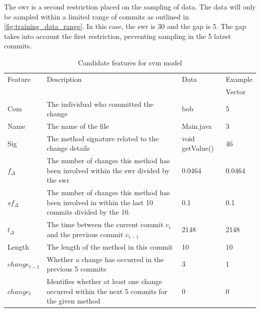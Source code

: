 The \gls{swr} is a second restriction placed on the sampling of data. The data will only be sampled within a limited range of commits as outlined in \autoref{fig:training_data_range}. In this case, the \gls{swr} is 30 and the gap is 5. The gap takes into account the first restriction, preventing sampling in the 5 latest commits.


\begin{table}
\begin{center}
    \begin{tabularx}{\linewidth}{|l|X|l|l|}
        \hline
        Feature & Description & Data & Example \\
         & & & Vector \\
        \hline
        Com & The individual who committed the change & bob & 5 \\ \hline
        Name & The name of the file & Main.java & 3 \\ \hline
        Sig & The method signature related to the change details & void getValue() & 46\\ \hline
        
        $f_{\Delta}$ & The number of changes this method has been involved within the \gls{swr} divided by the \gls{swr} & 0.0464 & 0.0464 \\ \hline
        $sf_{\Delta}$ & The number of changes this method has been involved in within the last 10 commits divided by the 10. & 0.1 & 0.1 \\ \hline
        $t_\Delta$ & The time between the current commit $c_i$ and the previous commit $c_{i-1}$ & 2148 & 2148 \\ \hline

        Length & The length of the method in this commit & 10 & 10 \\ \hline
        $change_{t-1}$ & Whether a change has occurred in the previous 5 commits & 3 & 1 \\
        \hline
        $change_{t}$ & Identifies whether at least one change occurred within the next 5 commits for the given method & 0 & 0\\
        \hline
    \end{tabularx}
\end{center}
    \caption{Candidate features for \gls{svm} model}
    \label{tab:candidate_features}
\end{table}

